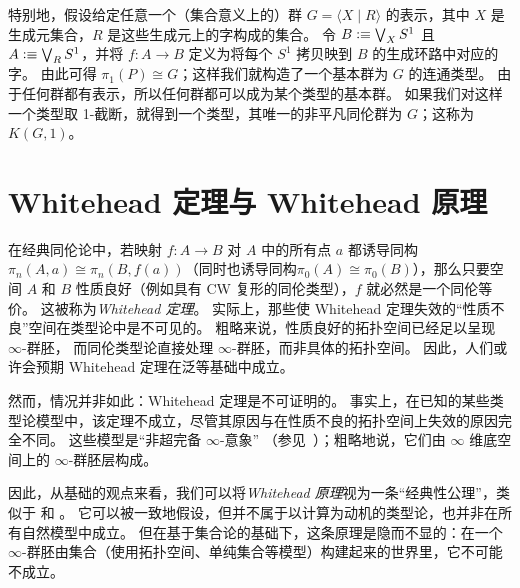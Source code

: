 \begin{eg}\label{eg:kg1}
  特别地，假设给定任意一个（集合意义上的）群 $G = \langle X \mid R \rangle$ 的表示，其中 $X$ 是生成元集合，$R$ 是这些生成元上的字构成的集合。
  令 $B\vcentcolon\equiv \bigvee_X S^1$ 且 $A\vcentcolon\equiv \bigvee_R S^1$，并将 $f:A\to B$ 定义为将每个 $S^1$ 拷贝映到 $B$ 的生成环路中对应的字。
  由此可得 $\pi_1(P) \cong G$；这样我们就构造了一个基本群为 $G$ 的连通类型。
  由于任何群都有表示，所以任何群都可以成为某个类型的基本群。
  如果我们对这样一个类型取 1-截断，就得到一个类型，其唯一的非平凡同伦群为 $G$；这称为 $K(G,1)$。%
\end{eg}

%

%
%

\section{Whitehead 定理与 Whitehead 原理}
\label{sec:whitehead}

在经典同伦论中，若映射 $f:A\to B$ 对 $A$ 中的所有点 $a$ 都诱导同构$\pi_n(A,a) \cong \pi_n(B,f(a))$（同时也诱导同构$\pi_0(A)\cong\pi_0(B)$），那么只要空间 $A$ 和 $B$ 性质良好（例如具有 CW 复形的同伦类型），$f$ 就必然是一个同伦等价。
%
%
这被称为\emph{Whitehead 定理}。
实际上，那些使 Whitehead 定理失效的“性质不良”空间在类型论中是不可见的。
粗略来说，性质良好的拓扑空间已经足以呈现 $\infty$-群胚，%
而同伦类型论直接处理 $\infty$-群胚，而非具体的拓扑空间。
因此，人们或许会预期 Whitehead 定理在泛等基础中成立。

然而，情况并非如此：Whitehead 定理是不可证明的。
事实上，在已知的某些类型论模型中，该定理不成立，尽管其原因与在性质不良的拓扑空间上失效的原因完全不同。
这些模型是“非超完备 $\infty$-意象”
%
%
（参见~\cite{lurie:higher-topoi}）；粗略地说，它们由 $\infty$ 维底空间上的 $\infty$-群胚层构成。

%
%

因此，从基础的观点来看，我们可以将\emph{Whitehead 原理}视为一条“经典性公理”，类似于 \LEM{} 和 \choice{}。
它可以被一致地假设，但并不属于以计算为动机的类型论，也并非在所有自然模型中成立。
但在基于集合论的基础下，这条原理是隐而不显的：在一个 $\infty$-群胚由集合（使用拓扑空间、单纯集合等模型）构建起来的世界里，它不可能不成立。

